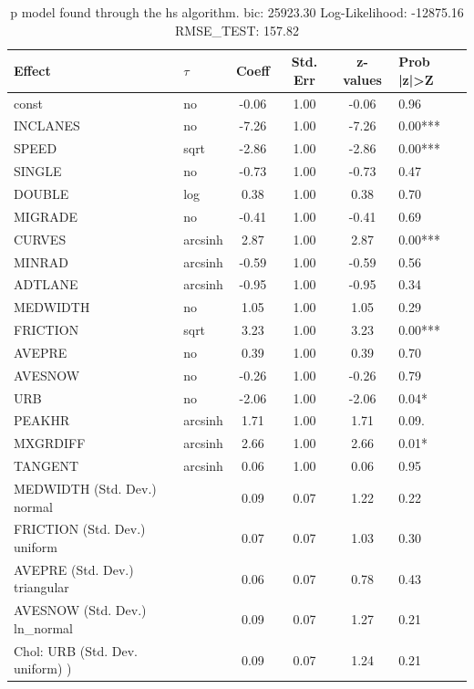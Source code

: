 \begin{table}
	\caption{p model found through the hs algorithm. bic: 25923.30 Log-Likelihood: -12875.16 RMSE_TEST: 157.82}
	\begin{center}
		\begin{tabular}{|l|l|c|c|c|l|}
			\hline
			Effect & $\tau$ & Coeff & Std. Err & z-values & Prob |z|>Z \\
			\hline
			const & no & -0.06 & 1.00 & -0.06 & 0.96 \\
			\hline
			INCLANES & no & -7.26 & 1.00 & -7.26 & 0.00*** \\
			\hline
			SPEED & sqrt & -2.86 & 1.00 & -2.86 & 0.00*** \\
			\hline
			SINGLE & no & -0.73 & 1.00 & -0.73 & 0.47 \\
			\hline
			DOUBLE & log & 0.38 & 1.00 & 0.38 & 0.70 \\
			\hline
			MIGRADE & no & -0.41 & 1.00 & -0.41 & 0.69 \\
			\hline
			CURVES & arcsinh & 2.87 & 1.00 & 2.87 & 0.00*** \\
			\hline
			MINRAD & arcsinh & -0.59 & 1.00 & -0.59 & 0.56 \\
			\hline
			ADTLANE & arcsinh & -0.95 & 1.00 & -0.95 & 0.34 \\
			\hline
			MEDWIDTH & no & 1.05 & 1.00 & 1.05 & 0.29 \\
			\hline
			FRICTION & sqrt & 3.23 & 1.00 & 3.23 & 0.00*** \\
			\hline
			AVEPRE & no & 0.39 & 1.00 & 0.39 & 0.70 \\
			\hline
			AVESNOW & no & -0.26 & 1.00 & -0.26 & 0.79 \\
			\hline
			URB & no & -2.06 & 1.00 & -2.06 & 0.04* \\
			\hline
			PEAKHR & arcsinh & 1.71 & 1.00 & 1.71 & 0.09. \\
			\hline
			MXGRDIFF & arcsinh & 2.66 & 1.00 & 2.66 & 0.01* \\
			\hline
			TANGENT & arcsinh & 0.06 & 1.00 & 0.06 & 0.95 \\
			\hline
			MEDWIDTH (Std. Dev.) normal &  & 0.09 & 0.07 & 1.22 & 0.22 \\
			\hline
			FRICTION (Std. Dev.) uniform &  & 0.07 & 0.07 & 1.03 & 0.30 \\
			\hline
			AVEPRE (Std. Dev.) triangular &  & 0.06 & 0.07 & 0.78 & 0.43 \\
			\hline
			AVESNOW (Std. Dev.) ln_normal &  & 0.09 & 0.07 & 1.27 & 0.21 \\
			\hline
			 Chol: URB (Std. Dev. uniform) ) &  & 0.09 & 0.07 & 1.24 & 0.21 \\

\end{tabular}
\end{center}
\end{table}
